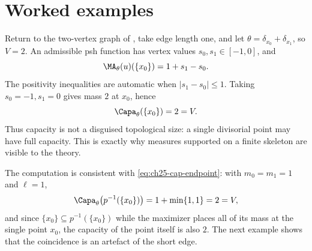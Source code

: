 \section{Worked examples}
\label{sec:ch25-worked}

\begin{example}
\label{ex:ch25-two-vertex-full-capacity}
Return to the two-vertex graph of , take edge
length one, and let
$\theta=\delta_{x_0}+\delta_{x_1}$, so $V=2$. An admissible psh function
has vertex values $s_0,s_1\in[-1,0]$, and
\[
 \MA_\theta(u)(\{x_0\})=1+s_1-s_0.
\]
The positivity inequalities are automatic when $|s_1-s_0|\leq1$. Taking
$s_0=-1,s_1=0$ gives mass $2$ at $x_0$, hence
\[
                 \Capa_\theta(\{x_0\})=2=V.
\]
Thus capacity is not a disguised topological size: a single divisorial point
may have full capacity. This is exactly why measures supported on a finite
skeleton are visible to the theory.
\end{example}

The computation is consistent with
\eqref{eq:ch25-cap-endpoint}: with $m_0=m_1=1$ and $\ell=1$,
\[
 \Capa_\theta\bigl(p^{-1}(\{x_0\})\bigr)=1+\min\{1,1\}=2=V,
\]
and since $\{x_0\}\subseteq p^{-1}(\{x_0\})$ while the maximizer places all
of its mass at the single point $x_0$, the capacity of the point itself is
also $2$.  The next example shows that the coincidence is an artefact of
the short edge.

